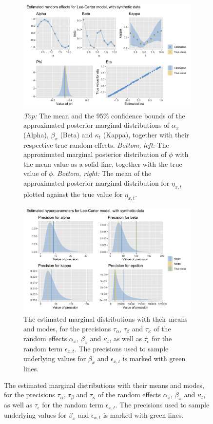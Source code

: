 \begin{figure}[h!]
    \centering
    \begin{subfigure}[b]{0.85\textwidth}
        \centering
        \includegraphics[width=\textwidth]{synthetic-data/Figures/effects-LC-synthetic.png}
        \caption{\textit{Top:} The mean and the 95\% confidence bounds of the approximated posterior marginal distributions of $\alpha_x$ (Alpha), $\beta_x$ (Beta) and $\kappa_t$ (Kappa), together with their respective true random effects. \textit{Bottom, left:} The approximated marginal posterior distribution of $\phi$ with the mean value as a solid line, together with the true value of $\phi$. \textit{Bottom, right:} The mean of the approximated posterior marginal distribution for $\eta_{x,t}$ plotted against the true value for $\eta_{x,t}$. }
        \label{fig:firstRun-top}
    \end{subfigure}
    
    \begin{subfigure}[b]{0.6\textwidth}
        \centering
        \includegraphics[width=\textwidth]{synthetic-data/Figures/hyperparameters-LC-synthetic-2-1.png}
        \caption{The estimated marginal distributions with their means and modes, for the precisions $\tau_\alpha$, $\tau_\beta$ and $\tau_\kappa$ of the random effects $\alpha_x$, $\beta_x$ and $\kappa_t$, as well as $\tau_\epsilon$ for the random term $\epsilon_{x,t}$. The precisions used to sample underlying values for $\beta_x$ and $\epsilon_{x,t}$ is marked with green lines.}
        \label{fig:firstRun-bottom}
    \end{subfigure}
    

\end{figure}
